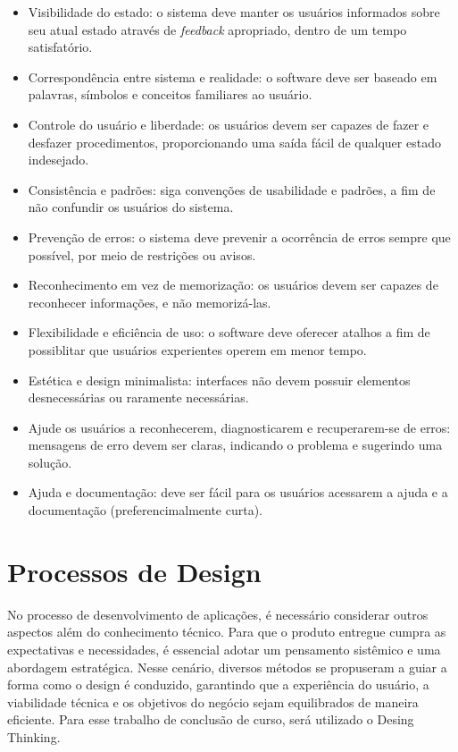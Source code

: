 \begin{itemize}
    \item Visibilidade do estado: o sistema deve manter os usuários informados sobre seu atual estado através de \textit{feedback} apropriado, dentro de um tempo satisfatório.
    \item Correspondência entre sistema e realidade: o software deve ser baseado em palavras, símbolos e conceitos familiares ao usuário.
    \item Controle do usuário e liberdade: os usuários devem ser capazes de fazer e desfazer procedimentos, proporcionando uma saída fácil de qualquer estado indesejado.
    \item Consistência e padrões: siga convenções de usabilidade e padrões, a fim de não confundir os usuários do sistema.
    \item Prevenção de erros: o sistema deve prevenir a ocorrência de erros sempre que possível, por meio de restrições ou avisos.
    \item Reconhecimento em vez de memorização: os usuários devem ser capazes de reconhecer informações, e não memorizá-las.
    \item Flexibilidade e eficiência de uso: o software deve oferecer atalhos  a fim de possiblitar que usuários experientes operem em menor tempo.
    \item Estética e design minimalista: interfaces não devem possuir elementos desnecessárias ou raramente necessárias.
    \item Ajude os usuários a reconhecerem, diagnosticarem e recuperarem-se de erros: mensagens de erro devem ser claras, indicando o problema e sugerindo uma solução.
    \item Ajuda e documentação: deve ser fácil para os usuários acessarem a ajuda e a documentação (preferencimalmente curta).
\end{itemize}

\section{Processos de Design}
No processo de desenvolvimento de aplicações, é necessário considerar outros aspectos além do conhecimento técnico. Para que o produto entregue cumpra as expectativas e necessidades, é essencial adotar um pensamento sistêmico e uma abordagem estratégica. Nesse cenário, diversos métodos se propuseram a guiar a forma como o design é conduzido, garantindo que a experiência do usuário, a viabilidade técnica e os objetivos do negócio sejam equilibrados de maneira eficiente. Para esse trabalho de conclusão de curso, será utilizado o Desing Thinking.

